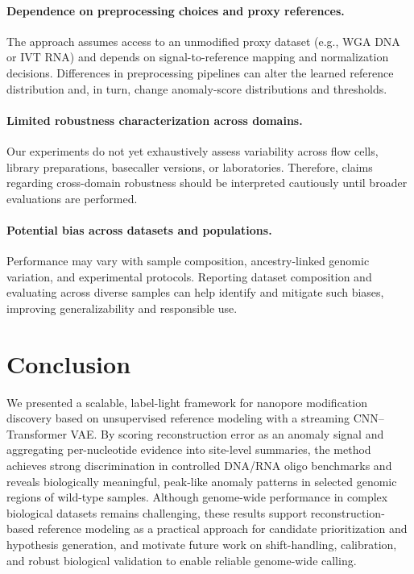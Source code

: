 \documentclass[sigconf, review]{acmart}
\begin{document}
\paragraph{Dependence on preprocessing choices and proxy references.}
The approach assumes access to an unmodified proxy dataset (e.g., WGA DNA or IVT RNA) and depends on signal-to-reference mapping and normalization decisions. Differences in preprocessing pipelines can alter the learned reference distribution and, in turn, change anomaly-score distributions and thresholds.

\paragraph{Limited robustness characterization across domains.}
Our experiments do not yet exhaustively assess variability across flow cells, library preparations, basecaller versions, or laboratories. Therefore, claims regarding cross-domain robustness should be interpreted cautiously until broader evaluations are performed.

\paragraph{Potential bias across datasets and populations.}
Performance may vary with sample composition, ancestry-linked genomic variation, and experimental protocols. Reporting dataset composition and evaluating across diverse samples can help identify and mitigate such biases, improving generalizability and responsible use.

\section{Conclusion}
We presented a scalable, label-light framework for nanopore modification discovery based on unsupervised reference modeling with a streaming CNN--Transformer VAE. By scoring reconstruction error as an anomaly signal and aggregating per-nucleotide evidence into site-level summaries, the method achieves strong discrimination in controlled DNA/RNA oligo benchmarks and reveals biologically meaningful, peak-like anomaly patterns in selected genomic regions of wild-type samples. Although genome-wide performance in complex biological datasets remains challenging, these results support reconstruction-based reference modeling as a practical approach for candidate prioritization and hypothesis generation, and motivate future work on shift-handling, calibration, and robust biological validation to enable reliable genome-wide calling.
\end{document}
